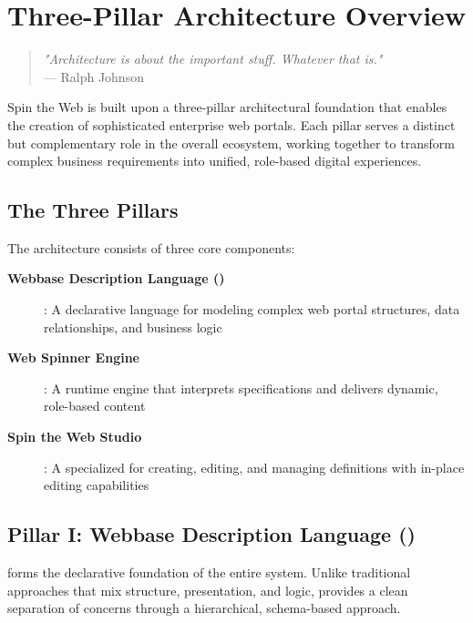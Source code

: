 
\chapter{Three-Pillar Architecture Overview}
\label{chap:architecture}

\begin{quote}
\textit{"Architecture is about the important stuff. Whatever that is."} \\
— Ralph Johnson
\end{quote}

Spin the Web is built upon a three-pillar architectural foundation that enables the creation of sophisticated enterprise web portals. Each pillar serves a distinct but complementary role in the overall ecosystem, working together to transform complex business requirements into unified, role-based digital experiences.

\section{The Three Pillars}
\label{sec:three-pillars}

The architecture consists of three core components:

\begin{description}
\item[\textbf{Webbase Description Language (\wbdl{})}]: A declarative language for modeling complex web portal structures, data relationships, and business logic
\item[\textbf{Web Spinner Engine}]: A runtime engine that interprets \wbdl{} specifications and delivers dynamic, role-based content
\item[\textbf{Spin the Web Studio}]: A specialized \webbaselet{} for creating, editing, and managing \webbase{} definitions with in-place editing capabilities
\end{description}

\section{Pillar I: Webbase Description Language (\wbdl{})}
\label{sec:pillar-wbdl}

\wbdl{} forms the declarative foundation of the entire system. Unlike traditional approaches that mix structure, presentation, and logic, \wbdl{} provides a clean separation of concerns through a hierarchical, schema-based approach.

